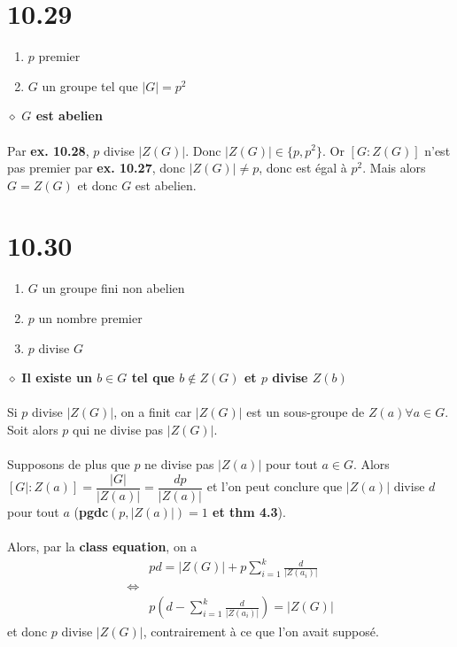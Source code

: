 \documentclass[a4paper,10pt]{article}
\begin{document}
\section*{10.29}
\begin{enumerate}
 \item $p$ premier
 \item $G$ un groupe tel que $|G| = p^2$
\end{enumerate}
$\diamond$ \textbf{$G$ est abelien}
\\
\\
Par \textbf{ex. 10.28}, $p$ divise $|Z(G)|$. Donc $|Z(G)| \in \{p,p^2\}$. Or $[G:Z(G)]$ n'est pas premier par \textbf{ex. 10.27},
donc $|Z(G)| \not = p$, donc est égal à $p^2$. Mais alors $G = Z(G)$ et donc $G$ est abelien.

\section*{10.30}
\begin{enumerate}
 \item $G$ un groupe fini non abelien
 \item $p$ un nombre premier
 \item $p$ divise $G$
\end{enumerate}
$\diamond$ \textbf{Il existe un $b \in G$ tel que $b \not \in Z(G)$ et $p$ divise $Z(b)$}
\\
\\
Si $p$ divise $|Z(G)|$, on a finit car $|Z(G)|$ est un sous-groupe de $Z(a) \forall a \in G$. Soit alors $p$ qui ne divise pas $|Z(G)|$. 
\\
\\
Supposons de plus que $p$ ne divise pas $|Z(a)|$ pour tout $a \in G$. Alors $[G|:Z(a)] = \dfrac{|G|}{|Z(a)|} = \dfrac{dp}{|Z(a)|}$ et 
l'on peut conclure que $|Z(a)|$ divise $d$ pour tout $a$ (\textbf{pgdc$(p,|Z(a)|)=1$ et thm 4.3}).
\\
\\
Alors, par la \textbf{class equation}, on a
\begin{align*}
 & pd = |Z(G)| + p\sum_{i=1}^k \frac{d}{|Z(a_i)|} \\
 \Leftrightarrow \\
 & p(d - \sum_{i=1}^k \frac{d}{|Z(a_i)|}) = |Z(G)|
\end{align*}
et donc $p$ divise $|Z(G)|$, contrairement à ce que l'on avait supposé.
\end{document}
